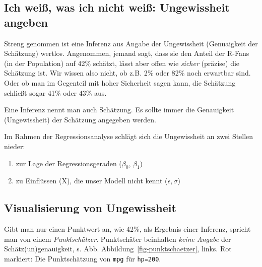 \documentclass[
  a4paper,
  DIV=11]{scrreprt}
\providecommand{\tightlist}{%
  \setlength{\itemsep}{0pt}\setlength{\parskip}{0pt}}\usepackage{longtable,booktabs,array}
\theoremstyle{definition}
\theoremstyle{remark}
\begin{document}
\hypertarget{ich-weiuxdf-was-ich-nicht-weiuxdf-ungewissheit-angeben}{%
\subsection{Ich weiß, was ich nicht weiß: Ungewissheit
angeben}\label{ich-weiuxdf-was-ich-nicht-weiuxdf-ungewissheit-angeben}}

Streng genommen ist eine Inferenz aus Angabe der Ungewissheit
(Genuaigkeit der Schätzung) wertlos. Angenommen, jemand sagt, dass sie
den Anteil der R-Fans (in der Population) auf 42\% schätzt, lässt aber
offen wie \emph{sicher} (präzise) die Schätzung ist. Wir wissen also
nicht, ob z.B. 2\% oder 82\% noch erwartbar sind. Oder ob man im
Gegenteil mit hoher Sicherheit sagen kann, die Schätzung schließt sogar
41\% oder 43\% aus.

\begin{tcolorbox}[enhanced jigsaw, leftrule=.75mm, toptitle=1mm, bottomtitle=1mm, titlerule=0mm, breakable, colframe=quarto-callout-important-color-frame, title=\textcolor{quarto-callout-important-color}{\faExclamation}\hspace{0.5em}{Wichtig}, rightrule=.15mm, colback=white, arc=.35mm, left=2mm, bottomrule=.15mm, coltitle=black, opacitybacktitle=0.6, toprule=.15mm, colbacktitle=quarto-callout-important-color!10!white, opacityback=0]
Eine Inferenz nennt man auch Schätzung. Es sollte immer die Genauigkeit
(Ungewissheit) der Schätzung angegeben werden.
\end{tcolorbox}

Im Rahmen der Regressionsanalyse schlägt sich die Ungewissheit an zwei
Stellen nieder:

\begin{enumerate}
\def\labelenumi{\arabic{enumi}.}
\tightlist
\item
  zur Lage der Regressionsgeraden (\(\beta_0\), \(\beta_1\))
\item
  zu Einflüssen (X), die unser Modell nicht kennt (\(\epsilon, \sigma\))
\end{enumerate}

\hypertarget{visualisierung-von-ungewissheit}{%
\subsection{Visualisierung von
Ungewissheit}\label{visualisierung-von-ungewissheit}}

Gibt man nur einen Punktwert an, wie 42\%, als Ergebnis einer Inferenz,
spricht man von einem \emph{Punktschätzer}. Punktschäter beinhalten
\emph{keine Angabe} der Schätz(un)genauigkeit, s. Abb.
Abbildung~\ref{fig-punktschaetzer}, links. Rot markiert: Die
Punktschätzung von \texttt{mpg} für \texttt{hp=200}.
\end{document}
